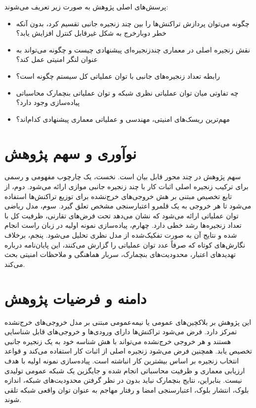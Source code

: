پرسش‌های اصلی پژوهش به صورت زیر تعریف می‌شوند:

\begin{itemize}
\item چگونه می‌توان پردازش تراکنش‌ها را بین چند زنجیره جانبی تقسیم کرد، بدون آنکه خطر دوبارخرج به شکل غیرقابل کنترل افزایش یابد؟
\item نقش زنجیره اصلی در معماری چندزنجیره‌ای پیشنهادی چیست و چگونه می‌تواند به عنوان لنگر امنیتی عمل کند؟
\item رابطه تعداد زنجیره‌های جانبی با توان عملیاتی کل سیستم چگونه است؟
\item چه تفاوتی میان توان عملیاتی نظری شبکه و توان عملیاتی بنچمارک محاسباتی پیاده‌سازی وجود دارد؟
\item مهم‌ترین ریسک‌های امنیتی، مهندسی و عملیاتی معماری پیشنهادی کدام‌اند؟
\end{itemize}

\section{نوآوری و سهم پژوهش}

سهم پژوهش در چند محور قابل بیان است. نخست، یک چارچوب مفهومی و رسمی برای ترکیب زنجیره اصلی اثبات کار با چند زنجیره جانبی موازی ارائه می‌شود. دوم، از تابع تخصیص مبتنی بر هش خروجی‌های خرج‌نشده برای توزیع تراکنش‌ها استفاده می‌شود تا هر خروجی به یک قلمرو اعتبارسنجی مشخص تعلق گیرد. سوم، مدل ریاضی توان عملیاتی ارائه می‌شود که نشان می‌دهد تحت فرض‌های تقارنی، ظرفیت کل با تعداد زنجیره‌ها رشد خطی دارد. چهارم، پیاده‌سازی نمونه اولیه در زبان راست انجام شده و نتایج آن به صورت تفکیک‌شده از مدل نظری تحلیل می‌شود. پنجم، برخلاف نگارش‌های کوتاه که صرفاً عدد توان عملیاتی را گزارش می‌کنند، این پایان‌نامه درباره تهدیدهای اعتبار، محدودیت‌های بنچمارک، سربار هماهنگی و ملاحظات امنیتی بحث می‌کند.

\section{دامنه و فرضیات پژوهش}

این پژوهش بر بلاکچین‌های عمومی یا نیمه‌عمومی مبتنی بر مدل خروجی‌های خرج‌نشده تمرکز دارد. فرض می‌شود تراکنش‌ها دارای ورودی‌ها و خروجی‌های قابل شناسایی هستند و هر خروجی خرج‌نشده می‌تواند با هش شناسه خود به یک زنجیره جانبی تخصیص یابد. همچنین فرض می‌شود زنجیره اصلی از اثبات کار استفاده می‌کند و قواعد انتخاب زنجیره بر اساس بیشترین کار انباشته است. پیاده‌سازی نمونه اولیه با هدف ارزیابی معماری و ظرفیت محاسباتی انجام شده و جایگزین یک شبکه عمومی تولیدی نیست. بنابراین، نتایج بنچمارک نباید بدون در نظر گرفتن محدودیت‌های شبکه، اندازه بلوک، انتشار بلوک، اعتبارسنجی امضا و رفتار مهاجم به عنوان توان واقعی شبکه تلقی شوند.

